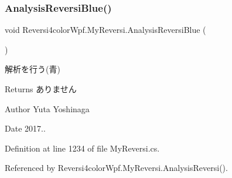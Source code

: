 \subsubsection{\texorpdfstring{Analysis\+Reversi\+Blue()}{AnalysisReversiBlue()}}
{\footnotesize\ttfamily void Reversi4color\+Wpf.\+My\+Reversi.\+Analysis\+Reversi\+Blue (\begin{DoxyParamCaption}{ }\end{DoxyParamCaption})\hspace{0.3cm}{\ttfamily [private]}}



解析を行う(青) 

\begin{DoxyReturn}{Returns}
ありません 
\end{DoxyReturn}
\begin{DoxyAuthor}{Author}
Yuta Yoshinaga 
\end{DoxyAuthor}
\begin{DoxyDate}{Date}
2017.. 
\end{DoxyDate}


Definition at line 1234 of file My\+Reversi.\+cs.



Referenced by Reversi4color\+Wpf.\+My\+Reversi.\+Analysis\+Reversi().


